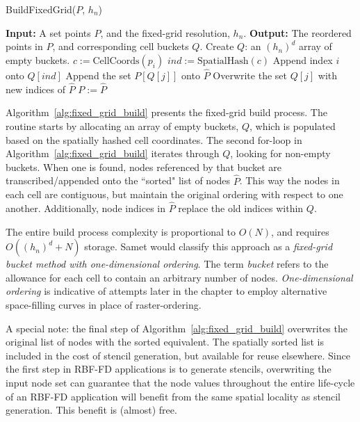 \documentclass{report}
\begin{document}
\begin{algorithm} 
\caption{BuildFixedGrid($P$, $h_n$)}         
\label{alg:fixed_grid_build}  
\begin{algorithmic}[1]    
    \State \textbf{Input:} A set points $P$, and the fixed-grid resolution, $h_n$.
    \State \textbf{Output:} The reordered points in $P$, and corresponding cell buckets $Q$.
    \State
    \State Create $Q$: an $(h_n)^d$ array of empty buckets. 
       \State $c := \text{CellCoords}(p_i)$ 
       \State $ind := \text{SpatialHash}(c)$
       \State Append index $i$ onto $Q[ind]$
    \EndFor
        \State Append the set $P[Q[j]]$ onto $\hat{P}$
        \State Overwrite the set $Q[j]$ with new indices of $\hat{P}$ 
    \EndIf
    \EndFor
    \State $P := \hat{P}$
    \State \Return 
    \end{algorithmic}
\end{algorithm}

Algorithm~\ref{alg:fixed_grid_build} presents the fixed-grid build process. The routine starts by allocating an array of empty buckets, $Q$, which is populated based on the spatially hashed cell coordinates. The second for-loop in Algorithm~\ref{alg:fixed_grid_build} iterates through $Q$, looking for non-empty buckets. When one is found, nodes referenced by that bucket are transcribed/appended onto the ``sorted" list of nodes $\hat{P}$. This way the nodes in each cell are contiguous, but maintain the original ordering with respect to one another. Additionally, node indices in $\hat{P}$ replace the old indices within $Q$.

The entire build process complexity is proportional to $O(N)$, and requires $O((h_n)^d + N)$ storage. Samet \cite{Samet2005} would classify this approach as a \emph{fixed-grid bucket method with one-dimensional ordering}. The term \emph{bucket} refers to the allowance for each cell to contain an arbitrary number of nodes. \emph{One-dimensional ordering} is indicative of attempts later in the chapter to employ alternative space-filling curves in place of raster-ordering. 

A special note: the final step of Algorithm~\ref{alg:fixed_grid_build} overwrites the original list of nodes with the sorted equivalent. The spatially sorted list is included in the cost of stencil generation, but available for reuse elsewhere. Since the first step in RBF-FD applications is to generate stencils, overwriting the input node set can guarantee that the node values throughout the entire life-cycle of an RBF-FD application will benefit from the same spatial locality as stencil generation. This benefit is (almost) free. 
\end{document}
